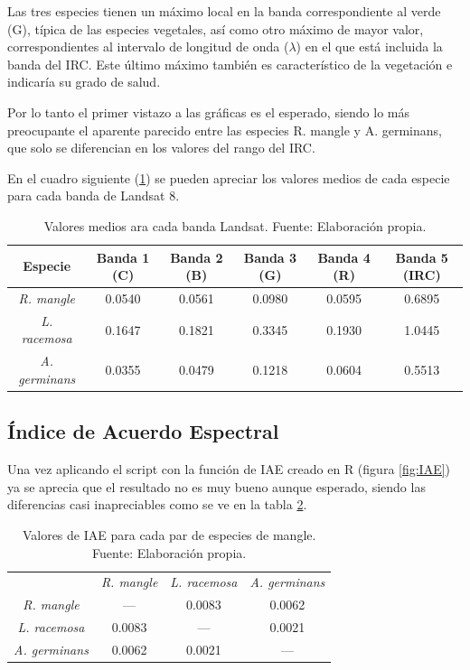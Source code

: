 Las tres especies tienen un máximo local en la banda correspondiente al verde (G), típica de las especies vegetales, así como otro máximo de mayor valor, correspondientes al intervalo de longitud de onda ($\lambda$) en el que está incluida la banda del \ac{IRC}. Este último máximo también es característico de la vegetación e indicaría su grado de salud.\Sep

Por lo tanto el primer vistazo a las gráficas es el esperado, siendo lo más preocupante el aparente parecido entre las especies R. mangle y A. germinans, que solo se diferencian en los valores del rango del \ac{IRC}.\Sep

En el cuadro siguiente (\ref{tab:valores_medios}) se pueden apreciar los valores medios de cada especie para cada banda de Landsat 8.

\begin{table}[ht]
	\centering
	\caption[Valores medios en las bandas Landsat]{Valores medios ara cada banda Landsat. Fuente: Elaboración propia.}
	\begin{tabular}{@{}cccccc@{}}
	\toprule[0.4mm]
	Especie & Banda 1 (C) & Banda 2 (B) & Banda 3 (G) & Banda 4 (R) & Banda 5 (IRC) \\
	\midrule
	\textit{R. mangle}	& 0.0540 & 0.0561 & 0.0980 & 0.0595 & 0.6895 \\
	\textit{L. racemosa} & 0.1647 & 0.1821 & 0.3345 & 0.1930 & 1.0445 \\
	\textit{A. germinans} & 0.0355 & 0.0479 & 0.1218 & 0.0604 & 0.5513 \\
	\bottomrule[0.4mm]
	\end{tabular}
	\label{tab:valores_medios}
\end{table}

\subsection{Índice de Acuerdo Espectral}
Una vez aplicando el script con la función de \ac{IAE} creado en R (figura \ref{fig:IAE}) ya se aprecia que el resultado no es muy bueno aunque esperado, siendo las diferencias casi inapreciables como se ve en la tabla \ref{tab:Valores_IAE}.\Sep %

\begin{table}[ht]
	\centering
	\caption[Valores de IAE]{Valores de \ac{IAE} para cada par de especies de mangle. Fuente: Elaboración propia.}
	\begin{tabular}{@{}cccc@{}}
	\toprule
	& \textit{R. mangle} & \textit{L. racemosa} & \textit{A. germinans} \\
	\textit{R. mangle} & --- & 0.0083 & 0.0062 \\
	\textit{L. racemosa} & 0.0083 & --- & 0.0021 \\
	\textit{A. germinans} & 0.0062 & 0.0021 & --- \\
	\bottomrule[0.4mm]
	\end{tabular}
	\label{tab:Valores_IAE}
\end{table}

